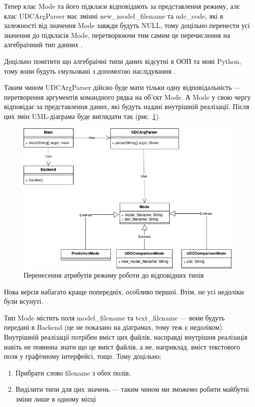 \documentclass[14pt]{extarticle}
\begin{document}
  Тепер клас Mode та його підкласи відповідають за представлення режиму,
  алє клас UDCArgParser має змінні new\_model\_filename та udc\_code,
  які в залежності від значення Mode завжди будуть NULL,
  тому доцільно перенести усі значення до підкласів Mode,
  перетворюючи тим самим це перечислення на алгебраічний тип данних
  \cite{ADT_wiki}.
  
  Доцільно помітити що алгебраічні типи даних відсутні в ООП та мові Python,
  тому вони будуть ємульовані з допомогою наслідування
  \cite{Code_complete_34_4, ADT_composition_over_inheritance}.
  
  Таким чином UDCArgParser дійсно буде мати тільки одну відповідальність ---
  перетворення аргументів командного рядка на об'єкт Mode.
  А Mode у свою чергу відповідає за представлення даних,
  які будуть надані внутрішній реалізації.
  Після цих змін UML-діаграма буде виглядати так (рис. \ref{fig:io_uml4}).

  \begin{figure}[H]
    \centering
    \includegraphics[width=\textwidth]{io_uml4.drawio.png}    
    \captionsetup{justification=centering}  
    \caption{Перенесення атрибутів режиму роботи до відповідних типів}
    \label{fig:io_uml4}
  \end{figure}
  
  Нова версія набагато краще попередніх, особливо першої.
  Втім, не усі недоліки були всунуті.
  
  Тип Mode містить поля model\_filename та text\_filename
  --- вони будуть передані в Backend
  (це не показано на діаграмах, тому теж є недоліком).
  Внутрішній реалізації потрібен вміст цих файлів,
  насправді внутрішня реалізація навіть не повинна знати що це вміст файлів,
  а не, наприклад, вміст текстового поля у графічному інтерфейсі, тощо.
  Тому доцільно:
    \begin{enumerate}[labelindent=\dimexpr\parindent\relax, leftmargin=*]
      \item Прибрати слово filename з обох полів,
      \item Виділити типи для цих значень ---
      таким чином ми зможемо робити майбутні зміни лише в одному місці
      \cite{Code_complete_5_3}
    \end{enumerate}
    
\end{document}
